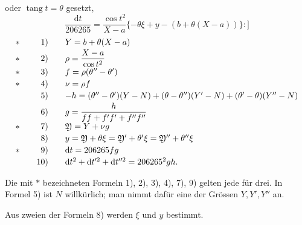 \noindent oder \(\operatorname{tang}t=\theta\) gesetzt,
\[
 \frac{\mathrm{d}t}{206265}=\frac{\cos t^2}{X-a}
 \{-\theta\xi+y-(b+\theta(X-a))\} :]
\]
\[
\begin{array}{@{}c@{\qquad}r@{\qquad}l@{}}
 \ast&1)&Y=b+\theta(X-a)\\[2pt]
 \ast&2)&\rho=\dfrac{X-a}{\cos t^2}\\[4pt]
 \ast&3)&f=\rho(\theta''-\theta')\\[2pt]
 \ast&4)&\nu=\rho f\\[2pt]
 &5)&-h=(\theta''-\theta')(Y-N)+(\theta-\theta'')(Y'-N)+(\theta'-\theta)(Y''-N)\\[2pt]
 &6)&g=\dfrac{h}{ff+f'f'+f''f''}\\[4pt]
 \ast&7)&\mathfrak{Y}=Y+\nu g\\[2pt]
 &8)&y=\mathfrak{Y}+\theta\xi=\mathfrak{Y}'+\theta'\xi=\mathfrak{Y}''+\theta''\xi\\[2pt]
 \ast&9)&\mathrm{d}t=206265fg\\[2pt]
 &10)&\mathrm{d}t^2+\mathrm{d}t^{\prime 2}+\mathrm{d}t^{\prime\prime 2}=206265^2gh.
\end{array}
\]

Die mit \(\ast\) bezeichneten Formeln 1), 2), 3), 4), 7), 9) gelten jede für drei. In Formel 5) ist \(N\) willkürlich; man nimmt dafür eine der Grössen \(Y,Y',Y''\) an.

Aus zweien der Formeln 8) werden \(\xi\) und \(y\) bestimmt.

\bigskip
{\centering
[5.]\par{}\par}
\medskip
[Es seien \(x,y\) genäherte Werthe der Coordinaten des zu bestimmenden Punktes, ferner \(a_i,b_i\) die Coordinaten der festen Punkte und \(T_i\) die auf die Ebene reducirten Azimuthe in diesen Punkten. Setzt man
\[
 x-a_i=r_i\cos t_i,\qquad y-b_i=r_i\sin t_i
\]
\noindent und
\[
 -206265\,.\,\frac{y-b_i}{r_ir_i}=\alpha_i,\qquad
 206265\,.\,\frac{x-a_i}{r_ir_i}=\beta_i
\]
\[
 t_i-T_i=n_i,
\]

\par\clearpage
\noindent\null\hfill{\small\textbf{TRIGONOMETRISCHE PUNKTBESTIMMUNG.}}\hfill\makebox[0pt][r]{\fontsize{13}{16}\selectfont 229}\par\medskip

